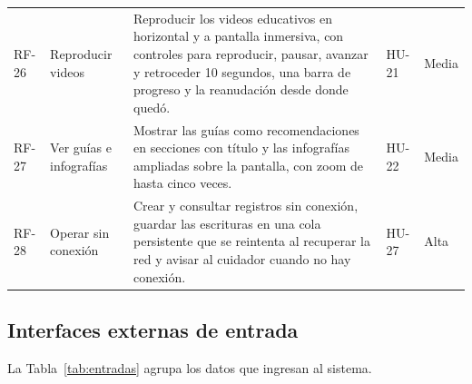 \begin{xltabular}{\textwidth}{P{0.42}P{0.95}P{2.33}P{0.55}P{0.75}}
    RF-26 & Reproducir videos &
    Reproducir los videos educativos en horizontal y a pantalla inmersiva, con
    controles para reproducir, pausar, avanzar y retroceder 10 segundos, una barra
    de progreso y la reanudación desde donde quedó. & HU-21 & Media \\
    RF-27 & Ver guías e infografías &
    Mostrar las guías como recomendaciones en secciones con título y las
    infografías ampliadas sobre la pantalla, con zoom de hasta cinco veces. & HU-22 & Media \\
    RF-28 & Operar sin conexión &
    Crear y consultar registros sin conexión, guardar las escrituras en una cola
    persistente que se reintenta al recuperar la red y avisar al cuidador cuando
    no hay conexión. & HU-27 & Alta \\
\end{xltabular}
\endgroup

\subsection[Interfaces Externas de Entrada]{Interfaces externas de entrada}

La Tabla~\ref{tab:entradas} agrupa los datos que ingresan al sistema.

